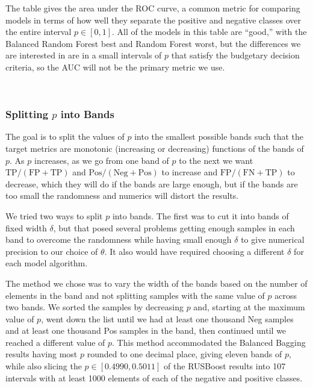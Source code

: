The table gives the area under the ROC curve, a common metric for comparing models in terms of how well they separate the positive and negative classes over the entire interval $p \in [0,1]$.  All of the models in this table are ``good,'' with the Balanced Random Forest best and Random Forest worst, but the differences we are interested in are in a small intervals of $p$ that satisfy the budgetary decision criteria, so the AUC will not be the primary metric we use.  

\



\FloatBarrier

\subsubsection{Splitting $p$ into Bands}
\label{p_bands}

The goal is to split the values of $p$ into the smallest possible bands such that the target metrics are monotonic (increasing or decreasing) functions of the bands of $p$.  As $p$ increases, as we go from one band of $p$ to the next we want 
$\text{TP}/(\text{FP} + \text{TP})$ 
and
$\text{Pos}/(\text{Neg} + \text{Pos})$ 
to increase and 
$\text{FP}/(\text{FN} + \text{TP})$ 
to decrease, which they will do if the bands are large enough, but if the bands are too small the randomness and numerics will distort the results.  

We tried two ways to split $p$ into bands.  The first was to cut it into bands of fixed width $\delta$, but that posed several problems getting enough samples in each band to overcome the randomness while having small enough $\delta$ to give numerical precision to our choice of $\theta$.  It also would have required choosing a different $\delta$ for each model algorithm.

The method we chose was to vary the width of the bands based on the number of elements in the band and not splitting samples with the same value of $p$ across two bands.  We sorted the samples by decreasing $p$ and, starting at the maximum value of $p$, went down the list until we had at least one thousand Neg samples and at least one thousand Pos samples in the band, then continued until we reached a different value of $p$.  This method accommodated the Balanced Bagging results having most $p$ rounded to one decimal place, giving eleven bands of $p$, while also slicing the $p \in [0.4990,0.5011]$ of the RUSBoost results into 107 intervals with at least 1000 elements of each of the negative and positive classes.  

